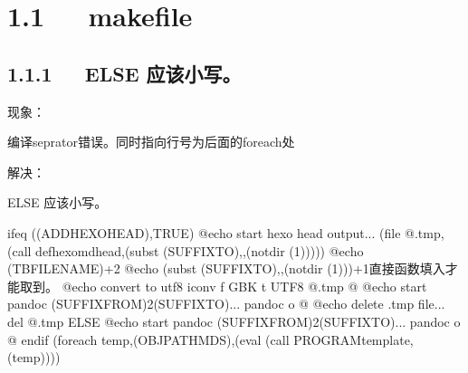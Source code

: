 \documentclass[letterpaper,12pt,english]{sphinxmanual}
\begin{document}
\section{1.1   makefile}
\label{\detokenize{000misc/memo-debug:makefile}}

\subsection{1.1.1   ELSE 应该小写。}
\label{\detokenize{000misc/memo-debug:else}}
现象：

编译seprator错误。同时指向行号为后面的foreach处

解决：

ELSE 应该小写。

\begin{sphinxVerbatim}[commandchars=\\\{\}]
ifeq (\PYGZdl{}(ADD\PYGZus{}HEXO\PYGZus{}HEAD),TRUE)
  @echo start hexo head output...
  \PYGZdl{}\PYGZdl{}(file \PYGZgt{}\PYGZdl{}\PYGZdl{}@.tmp,\PYGZdl{}\PYGZdl{}(call def\PYGZus{}hexo\PYGZus{}md\PYGZus{}head,\PYGZdl{}(subst \PYGZdl{}(SUFFIX\PYGZus{}TO),,\PYGZdl{}(notdir \PYGZdl{}(1)))))
\PYGZsh{} @echo \PYGZdl{}\PYGZdl{}(TBFILENAME)+2
\PYGZsh{} @echo \PYGZdl{}(subst \PYGZdl{}(SUFFIX\PYGZus{}TO),,\PYGZdl{}(notdir \PYGZdl{}(1)))+1\PYGZsh{}直接函数填入才能取到。
  @echo convert to utf8
  iconv \PYGZhy{}f GBK \PYGZhy{}t UTF\PYGZhy{}8 \PYGZdl{}\PYGZdl{}@.tmp \PYGZgt{}\PYGZdl{}\PYGZdl{}@
  @echo start pandoc \PYGZdl{}(SUFFIX\PYGZus{}FROM)2\PYGZdl{}(SUFFIX\PYGZus{}TO)...
  pandoc \PYGZdl{}\PYGZdl{}\PYGZlt{} \PYGZhy{}o \PYGZhy{} \PYGZgt{}\PYGZgt{}\PYGZdl{}\PYGZdl{}@
  @echo delete .tmp file...
  del \PYGZdl{}\PYGZdl{}@.tmp
ELSE
  @echo start pandoc \PYGZdl{}(SUFFIX\PYGZus{}FROM)2\PYGZdl{}(SUFFIX\PYGZus{}TO)...
  pandoc \PYGZdl{}\PYGZdl{}\PYGZlt{} \PYGZhy{}o \PYGZdl{}\PYGZdl{}@
endif
\PYGZdl{}(foreach temp,\PYGZdl{}(OBJ\PYGZus{}PATH\PYGZus{}MDS),\PYGZdl{}(eval \PYGZdl{}(call PROGRAM\PYGZus{}template,\PYGZdl{}(temp))))
\end{sphinxVerbatim}
\end{document}
